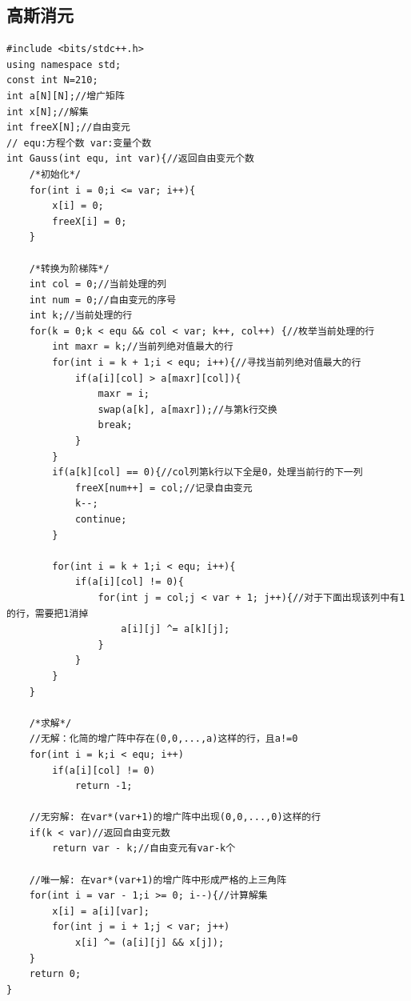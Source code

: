 \documentclass[twoside]{article}
\begin{document}
\subsection{高斯消元}
\begin{lstlisting}
#include <bits/stdc++.h>
using namespace std;
const int N=210;
int a[N][N];//增广矩阵
int x[N];//解集
int freeX[N];//自由变元
// equ:方程个数 var:变量个数
int Gauss(int equ, int var){//返回自由变元个数
    /*初始化*/
    for(int i = 0;i <= var; i++){
        x[i] = 0;
        freeX[i] = 0;
    }

    /*转换为阶梯阵*/
    int col = 0;//当前处理的列
    int num = 0;//自由变元的序号
    int k;//当前处理的行
    for(k = 0;k < equ && col < var; k++, col++) {//枚举当前处理的行
        int maxr = k;//当前列绝对值最大的行
        for(int i = k + 1;i < equ; i++){//寻找当前列绝对值最大的行
            if(a[i][col] > a[maxr][col]){
                maxr = i;
                swap(a[k], a[maxr]);//与第k行交换
                break;
            }
        }
        if(a[k][col] == 0){//col列第k行以下全是0，处理当前行的下一列
            freeX[num++] = col;//记录自由变元
            k--;
            continue;
        }

        for(int i = k + 1;i < equ; i++){
            if(a[i][col] != 0){
                for(int j = col;j < var + 1; j++){//对于下面出现该列中有1的行，需要把1消掉
                    a[i][j] ^= a[k][j];
                }
            }
        }
    }

    /*求解*/
    //无解：化简的增广阵中存在(0,0,...,a)这样的行，且a!=0
    for(int i = k;i < equ; i++)
        if(a[i][col] != 0)
            return -1;

    //无穷解: 在var*(var+1)的增广阵中出现(0,0,...,0)这样的行
    if(k < var)//返回自由变元数
        return var - k;//自由变元有var-k个

    //唯一解: 在var*(var+1)的增广阵中形成严格的上三角阵
    for(int i = var - 1;i >= 0; i--){//计算解集
        x[i] = a[i][var];
        for(int j = i + 1;j < var; j++)
            x[i] ^= (a[i][j] && x[j]);
    }
    return 0;
}\end{lstlisting}
\end{document}
